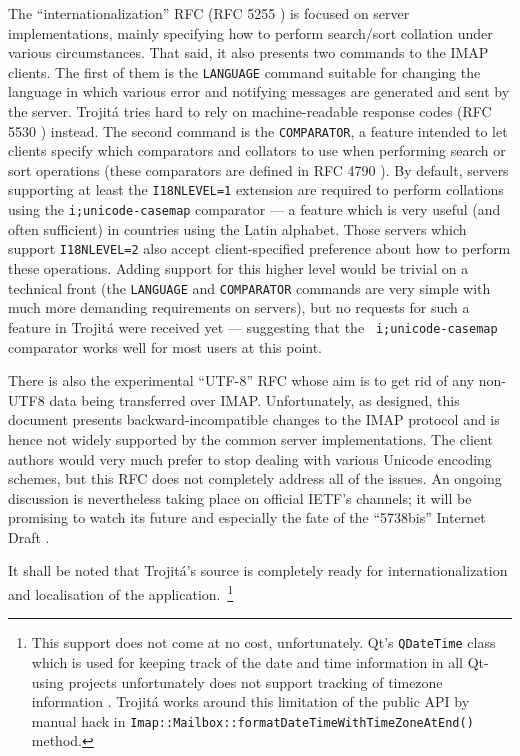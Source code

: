 \documentclass[trojita]{subfiles}
\begin{document}
The ``internationalization'' RFC (RFC 5255 \cite{rfc5255}) is focused on server implementations, mainly specifying how
to perform search/sort collation under various circumstances.  That said, it also presents two commands to the IMAP
clients.  The first of them is the {\tt LANGUAGE} command suitable for changing the language in which various error and
notifying messages are generated and sent by the server.  Trojitá tries hard to rely on machine-readable response codes
(RFC 5530 \cite{rfc5530}) instead.  The second command is the {\tt COMPARATOR}, a feature intended to let clients
specify which comparators and collators to use when performing search or sort operations (these comparators are defined
in RFC 4790 \cite{rfc4790}).  By default, servers supporting at least the {\tt I18NLEVEL=1} extension are required to
perform collations using the {\tt i;unicode-casemap} comparator \cite{rfc5051} --- a feature which is very useful (and
often sufficient) in countries using the Latin alphabet.  Those servers which support {\tt I18NLEVEL=2} also accept
client-specified preference about how to perform these operations.  Adding support for this higher level would be
trivial on a technical front (the {\tt LANGUAGE} and {\tt COMPARATOR} commands are very simple with much more demanding
requirements on servers), but no requests for such a feature in Trojitá were received yet --- suggesting that the {\tt
i;unicode-casemap} comparator works well for most users at this point.

There is also the experimental ``UTF-8'' RFC \cite{rfc5738} whose aim is to get rid of any non-UTF8 data being
transferred over IMAP.  Unfortunately, as designed, this document presents backward-incompatible changes to the IMAP
protocol and is hence not widely supported by the common server implementations.  The client authors would very much
prefer to stop dealing with various Unicode encoding schemes, but this RFC does not completely address all of the
issues.  An ongoing discussion is nevertheless taking place on official IETF's channels; it will be promising to watch
its future and especially the fate of the ``5738bis'' Internet Draft \cite{draft-ietf-eai-5738bis}.

It shall be noted that Trojitá's source is completely ready for internationalization and localisation of the
application.~\footnote{This support does not come at no cost, unfortunately.  Qt's {\tt QDateTime} class which is used
for keeping track of the date and time information in all Qt-using projects unfortunately does not support tracking of
timezone information \cite{qt-qdatetime-tz}.  Trojitá works around this limitation of the public API by manual hack in
{\tt Imap::Mailbox::formatDateTimeWithTimeZoneAtEnd()} method.}
\end{document}
